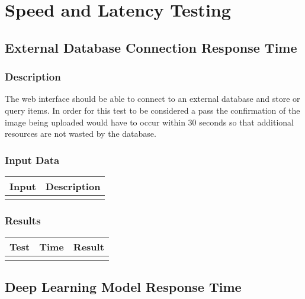 \documentclass{scrreprt}
\begin{document}
\section{Speed and Latency Testing}

\subsection{External Database Connection Response Time}
\subsubsection{Description}
\begin{flushleft}
The web interface should be able to connect to an external database and store or query items. In order for this test to be considered a pass the confirmation of the image being uploaded would have to occur within 30 seconds so that additional resources are not wasted by the database.
\subsubsection{Input Data}
 \centering
 \begin{tabular}{p{3cm}p{6cm}}
 \hline\hline
 Input & Description\\
 \hline\hline
   &  \\ %
 \hline
 \end{tabular}
\subsubsection{Results}
\end{flushleft}
 \centering
 \begin{tabular}{||p{1.5cm}|p{1.5cm}|p{1.5cm}||}
 \hline
 \textbf Test & \textbf Time & \textbf Result \\
 \hline\hline
   &  & \\ %
 \hline
 \end{tabular}

 \vspace{1cm}

\subsection{Deep Learning Model Response Time}
\end{document}
